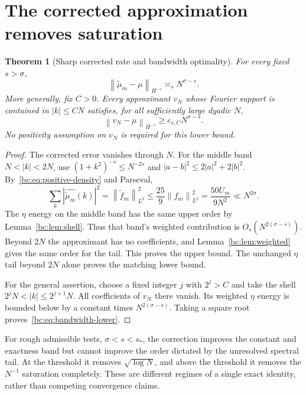 \documentclass[11pt,a4paper,oneside,openany]{book}
\numberwithin{equation}{chapter}
\newtheorem{theorem}{Theorem}[chapter]
\theoremstyle{definition}
\theoremstyle{remark}
\newcommand{\norm}[1]{\left\lVert #1\right\rVert}
\newcommand{\mt}{\widetilde\mu}
\newcommand{\ft}{\widetilde f}
\begin{document}
\section{The corrected approximation removes saturation}
\begin{theorem}[Sharp corrected rate and bandwidth optimality]
\label{bc:thm:corrected-rate}
For every fixed $s>\sigma$,
\begin{equation}
 \boxed{\quad
 \norm{\mt_m-\mu}_{H^{-s}}\asymp_s N^{\sigma-s}.
 \quad}
 \label{bc:eq:corrected-rates}
\end{equation}
More generally, fix $C>0$. Every approximant $v_N$ whose Fourier support is
contained in $|k|\le CN$ satisfies, for all sufficiently large dyadic $N$,
\begin{equation}
 \norm{v_N-\mu}_{H^{-s}}\ge c_{s,C}N^{\sigma-s}.
 \label{bc:eq:bandwidth-lower}
\end{equation}
No positivity assumption on $v_N$ is required for this lower bound.
\end{theorem}
\begin{proof}
The corrected error vanishes through $N$. For the middle band $N<|k|<2N$,
use $(1+k^2)^{-s}\le N^{-2s}$ and
$|a-b|^2\le2|a|^2+2|b|^2$. By~\eqref{bc:eq:positive-density} and Parseval,
\[
 \sum_k|\widehat{\mt_m}(k)|^2
 =\norm{\ft_m}_{L^2}^2
 \le\frac{25}{9}\norm{f_m}_{L^2}^2
 =\frac{50U_m}{9N^2}\ll N^{2\sigma}.
\]
The $\eta$ energy on the middle band has the same upper order by
Lemma~\ref{bc:lem:shell}. Thus that band's weighted contribution is
$O_s(N^{2(\sigma-s)})$. Beyond $2N$ the approximant has no coefficients, and
Lemma~\ref{bc:lem:weighted} gives the same order for the tail. This proves the
upper bound. The unchanged $\eta$ tail beyond $2N$ alone proves the matching
lower bound.

For the general assertion, choose a fixed integer $j$ with $2^j>C$ and take the
shell $2^jN<|k|\le2^{j+1}N$. All coefficients of $v_N$ there vanish. Its
weighted $\eta$ energy is bounded below by a constant times
$N^{2(\sigma-s)}$. Taking a square root proves~\eqref{bc:eq:bandwidth-lower}.
\end{proof}

For rough admissible tests, $\sigma<s<s_*$, the correction improves the constant
and exactness band but cannot improve the order dictated by the unresolved
spectral tail. At the threshold it removes $\sqrt{\log N}$, and above the
threshold it removes the $N^{-1}$ saturation completely. These are different
regimes of a single exact identity, rather than competing convergence claims.
\end{document}
